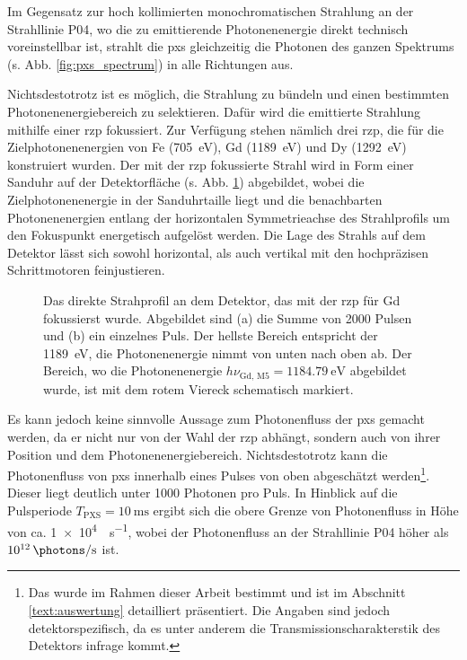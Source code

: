 \noindent
Im Gegensatz zur hoch kollimierten monochromatischen Strahlung an der Strahllinie P04, wo die zu emittierende Photonenenergie direkt technisch voreinstellbar ist, strahlt die \gls{pxs} gleichzeitig die Photonen des ganzen Spektrums (s. Abb. \ref{fig:pxs_spectrum}) in alle Richtungen aus.

\noindent
Nichtsdestotrotz ist es möglich, die Strahlung zu bündeln und einen bestimmten Photonenenergiebereich zu selektieren. Dafür wird die emittierte Strahlung mithilfe einer \gls{rzp} fokussiert. Zur Verfügung stehen nämlich drei \gls{rzp}, die für die Zielphotonenenergien von Fe (\SI{705}{\eV}), Gd (\SI{1189}{\eV}) und Dy (\SI{1292}{\eV}) konstruiert wurden. Der mit der \gls{rzp} fokussierte Strahl wird in Form einer Sanduhr auf der Detektorfläche (s. Abb. \ref{fig:butterfly_moench}) abgebildet, wobei die Zielphotonenenergie in der Sanduhrtaille liegt und die benachbarten Photonenenergien entlang der horizontalen Symmetrieachse des Strahlprofils um den Fokuspunkt energetisch aufgelöst werden. Die Lage des Strahls auf dem Detektor lässt sich sowohl horizontal, als auch vertikal mit den hochpräzisen Schrittmotoren feinjustieren.
\begin{figure}[H]
    \centering
    \subfloat[]{\label{fig:butterfly_moench_sum}}
    \hfill
    \subfloat[]{\label{fig:butterfly_moench_single_shot}}
    \caption{Das direkte Strahprofil an dem Detektor, das mit der \gls{rzp} für Gd fokussierst wurde. Abgebildet sind (a) die Summe von 2000 Pulsen und (b) ein einzelnes Puls. Der hellste Bereich entspricht der \SI{1189}{\eV}, die Photonenenergie nimmt von unten nach oben ab. Der Bereich, wo die Photonenenergie $h\nu_{\text{Gd, M5}} = \SI{1184,79}{\eV}$ abgebildet wurde, ist mit dem rotem Viereck schematisch markiert.}
    \label{fig:butterfly_moench}
\end{figure}
\noindent
Es kann jedoch keine sinnvolle Aussage zum Photonenfluss der \gls{pxs} gemacht werden, da er nicht nur von der Wahl der \gls{rzp} abhängt, sondern auch von ihrer Position und dem  Photonenenergiebereich. Nichtsdestotrotz kann die Photonenfluss von \gls{pxs} innerhalb eines Pulses von oben abgeschätzt werden\footnote[2]{\label{footnote:einschub_in_auswertung} Das wurde im Rahmen dieser Arbeit bestimmt und ist im Abschnitt \ref{text:auswertung} detailliert präsentiert. Die Angaben sind jedoch detektorspezifisch, da es unter anderem die Transmissionscharakterstik des Detektors infrage kommt.}. Dieser liegt deutlich unter 1000 Photonen pro Puls. In Hinblick auf die Pulsperiode $T_\text{PXS}=\SI{10}{\milli\second}$ ergibt sich die obere Grenze von Photonenfluss in Höhe von ca. \SI{1e4}{\photons\per\second}, wobei der Photonenfluss an der Strahllinie P04 höher als $\SI{1e12}{\photons\per\second}$ ist.

